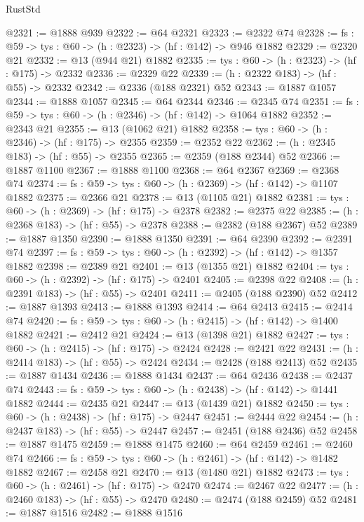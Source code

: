 \begin{lexlean}{RustStd}
\begin{coremodule}
@2321 := @1888 @939
@2322 := @64 @2321
@2323 := @2322 @74
@2328 := {fs : @59} -> {tys : @60} -> (h : @2323) -> (hf : @142) -> @946 @1882
@2329 := @2320 @21
@2332 := @13 (@944 @21) @1882
@2335 := {tys : @60} -> (h : @2323) -> (hf : @175) -> @2332
@2336 := @2329 @22
@2339 := (h : @2322 @183) -> (hf : @55) -> @2332
@2342 := @2336 (@188 @2321) @52
@2343 := @1887 @1057
@2344 := @1888 @1057
@2345 := @64 @2344
@2346 := @2345 @74
@2351 := {fs : @59} -> {tys : @60} -> (h : @2346) -> (hf : @142) -> @1064 @1882
@2352 := @2343 @21
@2355 := @13 (@1062 @21) @1882
@2358 := {tys : @60} -> (h : @2346) -> (hf : @175) -> @2355
@2359 := @2352 @22
@2362 := (h : @2345 @183) -> (hf : @55) -> @2355
@2365 := @2359 (@188 @2344) @52
@2366 := @1887 @1100
@2367 := @1888 @1100
@2368 := @64 @2367
@2369 := @2368 @74
@2374 := {fs : @59} -> {tys : @60} -> (h : @2369) -> (hf : @142) -> @1107 @1882
@2375 := @2366 @21
@2378 := @13 (@1105 @21) @1882
@2381 := {tys : @60} -> (h : @2369) -> (hf : @175) -> @2378
@2382 := @2375 @22
@2385 := (h : @2368 @183) -> (hf : @55) -> @2378
@2388 := @2382 (@188 @2367) @52
@2389 := @1887 @1350
@2390 := @1888 @1350
@2391 := @64 @2390
@2392 := @2391 @74
@2397 := {fs : @59} -> {tys : @60} -> (h : @2392) -> (hf : @142) -> @1357 @1882
@2398 := @2389 @21
@2401 := @13 (@1355 @21) @1882
@2404 := {tys : @60} -> (h : @2392) -> (hf : @175) -> @2401
@2405 := @2398 @22
@2408 := (h : @2391 @183) -> (hf : @55) -> @2401
@2411 := @2405 (@188 @2390) @52
@2412 := @1887 @1393
@2413 := @1888 @1393
@2414 := @64 @2413
@2415 := @2414 @74
@2420 := {fs : @59} -> {tys : @60} -> (h : @2415) -> (hf : @142) -> @1400 @1882
@2421 := @2412 @21
@2424 := @13 (@1398 @21) @1882
@2427 := {tys : @60} -> (h : @2415) -> (hf : @175) -> @2424
@2428 := @2421 @22
@2431 := (h : @2414 @183) -> (hf : @55) -> @2424
@2434 := @2428 (@188 @2413) @52
@2435 := @1887 @1434
@2436 := @1888 @1434
@2437 := @64 @2436
@2438 := @2437 @74
@2443 := {fs : @59} -> {tys : @60} -> (h : @2438) -> (hf : @142) -> @1441 @1882
@2444 := @2435 @21
@2447 := @13 (@1439 @21) @1882
@2450 := {tys : @60} -> (h : @2438) -> (hf : @175) -> @2447
@2451 := @2444 @22
@2454 := (h : @2437 @183) -> (hf : @55) -> @2447
@2457 := @2451 (@188 @2436) @52
@2458 := @1887 @1475
@2459 := @1888 @1475
@2460 := @64 @2459
@2461 := @2460 @74
@2466 := {fs : @59} -> {tys : @60} -> (h : @2461) -> (hf : @142) -> @1482 @1882
@2467 := @2458 @21
@2470 := @13 (@1480 @21) @1882
@2473 := {tys : @60} -> (h : @2461) -> (hf : @175) -> @2470
@2474 := @2467 @22
@2477 := (h : @2460 @183) -> (hf : @55) -> @2470
@2480 := @2474 (@188 @2459) @52
@2481 := @1887 @1516
@2482 := @1888 @1516

\end{coremodule}
\end{lexlean}
